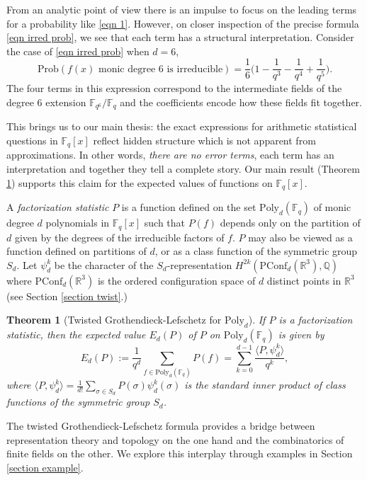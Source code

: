\documentclass[submission]{FPSAC2018}
\newtheorem{thm}{Theorem}[section]
\theoremstyle{definition}
\numberwithin{equation}{section}
\def\QQ{\mathbb{Q}}
\def\FF{\mathbb{F}}
\def\RR{\mathbb{R}}
\newcommand\PConf{\mathrm{PConf}}
\newcommand{\poly}{\mathrm{Poly}}
\begin{document}
From an analytic point of view there is an impulse to focus on the leading terms for a probability like \eqref{eqn 1}. However, on closer inspection of the precise formula \eqref{eqn irred prob}, we see that each term has a structural interpretation. Consider the case of \eqref{eqn irred prob} when $d = 6$,
\[
    \mathrm{Prob}(f(x)\text{ monic degree $6$ is irreducible}) = \frac{1}{6}\bigg(1 - \frac{1}{q^3} - \frac{1}{q^4} + \frac{1}{q^5}\bigg).
\]
The four terms in this expression correspond to the intermediate fields of the degree 6 extension $\FF_{q^6}/\FF_q$ and the coefficients encode how these fields fit together.

This brings us to our main thesis: the exact expressions for arithmetic statistical questions in $\FF_q[x]$ reflect hidden structure which is not apparent from approximations. In other words, \emph{there are no error terms}, each term has an interpretation and together they tell a complete story. Our main result (Theorem \ref{thm twist intro}) supports this claim for the expected values of functions on $\FF_q[x]$.

A \emph{factorization statistic} $P$ is a function defined on the set $\poly_d(\FF_q)$ of monic degree $d$ polynomials in $\FF_q[x]$ such that $P(f)$ depends only on the partition of $d$ given by the degrees of the irreducible factors of $f$.
$P$ may also be viewed as a function defined on partitions of $d$, or as a class function of the symmetric group $S_d$. Let $\psi_d^k$ be the character of the $S_d$-representation $H^{2k}(\PConf_d(\RR^3),\QQ)$ where $\PConf_d(\RR^3)$ is the ordered configuration space of $d$ distinct points in $\RR^3$ (see Section \ref{section twist}.) 

\begin{thm}[Twisted Grothendieck-Lefschetz for $\poly_d$]
\label{thm twist intro}
If $P$ is a factorization statistic, then the expected value $E_d(P)$ of $P$ on $\poly_d(\FF_q)$ is given by
\[
    E_d(P) := \frac{1}{q^d}\sum_{f\in \poly_d(\FF_q)}P(f) = \sum_{k=0}^{d-1}\frac{\langle P, \psi_d^k\rangle}{q^k},
\]
where $\langle P, \psi_d^k\rangle = \frac{1}{d!}\sum_{\sigma\in S_d} P(\sigma)\psi_d^k(\sigma)$ is the standard inner product of class functions of the symmetric group $S_d$.
\end{thm}

The twisted Grothendieck-Lefschetz formula provides a bridge between representation theory and topology on the one hand and the combinatorics of finite fields on the other. We explore this interplay through examples in Section \ref{section example}.
\end{document}
